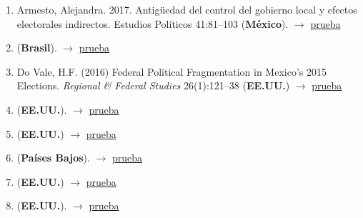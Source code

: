 \documentclass[12 pt, letter]{article}
\newenvironment{CitasMiTrabajo}{
    \begin{footnotesize}
    \begin{enumerate}[label={\footnotesize\emph{cita~\arabic*}},ref=\arabic*] %
        \setlength{\itemsep}{.1\itemsep}
        \setlength{\parskip}{.1\parskip}
    }{\end{enumerate}\end{footnotesize}}
\begin{document}
        \begin{CitasMiTrabajo}

        \item Armesto, Alejandra. 2017. Antig\"uedad del control del gobierno local y efectos electorales indirectos. Estudios Pol\'iticos 41:81--103  (\textbf{M\'exico}).  $\rightarrow$ \href{https://doi.org/10.1016/j.espol.2017.02.003}{prueba}
          
        \item {} (\textbf{Brasil}).  $\rightarrow$ \href{https://github.com/emagar/cv/blob/master/citasMiTrab/gubCoatJOP2012/borgesNacionalizacao2015dados.excerpt.pdf}{prueba}

        \item Do Vale, H.F. (2016) Federal Political Fragmentation in Mexico's 2015 Elections. \emph{Regional \& Federal Studies} 26(1):121--38 (\textbf{EE.UU.})  $\rightarrow$ \href{https://www.researchgate.net/profile/Helder_Ferreira_Do_Vale/publication/294106534_Federal_Political_Fragmentation_in_Mexico}{prueba}

        \item {} (\textbf{EE.UU.}).  $\rightarrow$ \href{https://www.sciencedirect.com/science/article/pii/S0261379416300750}{prueba}

        \item {} (\textbf{EE.UU.})  $\rightarrow$ \href{https://github.com/emagar/cv/blob/master/citasMiTrab/gubCoatJOP2012/garmendia.ozenCoattails2015es.pdf}{prueba}

        \item {} (\textbf{Pa\'ises Bajos}).  $\rightarrow$ \href{https://doi.org/10.1016/j.ejpoleco.2018.10.001}{prueba}

        \item {} (\textbf{EE.UU.}) $\rightarrow$ \href{https://github.com/emagar/cv/blob/master/citasMiTrab/gubCoatJOP2012/huang.wangCoattailsTaiwan2014es.excerpt.pdf}{prueba}

        \item {} (\textbf{EE.UU.}).  $\rightarrow$ \href{https://graduate.artsci.wustl.edu/files/graduatepages/imce/lucardi/lucardimicozzi_electoralcycle.pdf}{prueba}


\end{CitasMiTrabajo}
\end{document}
